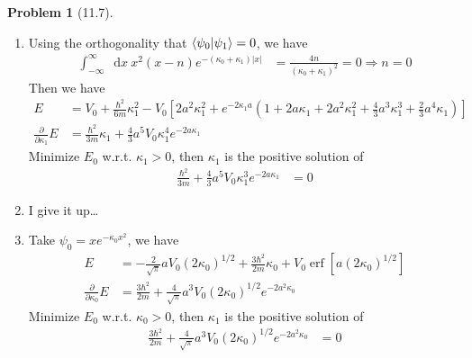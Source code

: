 \documentclass[twoside,11pt]{article}
\renewcommand*\d{\mathop{}\!\mathrm{d}}
\DeclareMathOperator{\erf}{erf}
\theoremstyle{definition}
\newtheorem{problem}{Problem}
\theoremstyle{remark}
\begin{document}
\begin{problem}[11.7]
\begin{enumerate}[label=(\alph*)]
\item Using the orthogonality that $\braket{\psi_0|\psi_1}=0$, we have
\begin{align*}
    \int_{-\infty}^\infty\d x\ 
    x^2(x-n)e^{-(\kappa_0+\kappa_1)|x|} 
    &= \frac{4n}{(\kappa_0+\kappa_1)^2} = 0
    \Rightarrow n = 0
\end{align*}
Then we have
\begin{align*}
    E &= 
    V_0 + \frac{\hbar^2}{6m}\kappa_1^2
    - V_0\left[
    2a^2\kappa_1^2
    + e^{-2\kappa_1 a}\left(1 + 2a\kappa_1 + 2a^2\kappa_1^2
    + \frac{4}{3}a^3\kappa_1^3 + \frac{2}{3}a^4\kappa_1\right)
    \right]\\
    \frac{\partial}{\partial \kappa_1}E &= 
    \frac{\hbar^2}{3m}\kappa_1
    + \frac{4}{3}a^5V_0\kappa_1^4e^{-2a\kappa_1}
\end{align*}
Minimize $E_0$ w.r.t. $\kappa_1>0$, then $\kappa_1$ is the positive solution 
of
\begin{align*}
    \frac{\hbar^2}{3m}
    + \frac{4}{3}a^5V_0\kappa_1^3e^{-2a\kappa_1}
    &= 0
\end{align*}


\item I give it up\dots


\item Take $\psi_0=xe^{-\kappa_0 x^2}$, we have
\begin{align*}
    E &= -\frac{2}{\sqrt{\pi}}aV_0(2\kappa_0)^{1/2}
    + \frac{3\hbar^2}{2m}\kappa_0
    + V_0\erf [a(2\kappa_0)^{1/2}]\\
    \frac{\partial}{\partial \kappa_0} E &= 
    \frac{3\hbar^2}{2m} 
    + \frac{4}{\sqrt{\pi}}a^3V_0(2\kappa_0)^{1/2}e^{-2a^2\kappa_0}
\end{align*}
Minimize $E_0$ w.r.t. $\kappa_0>0$, then $\kappa_1$ is the positive solution 
of
\begin{align*}
    \frac{3\hbar^2}{2m} 
    + \frac{4}{\sqrt{\pi}}a^3V_0(2\kappa_0)^{1/2}e^{-2a^2\kappa_0}
    &= 0
\end{align*}


\end{enumerate}
\end{problem}





\end{document}
